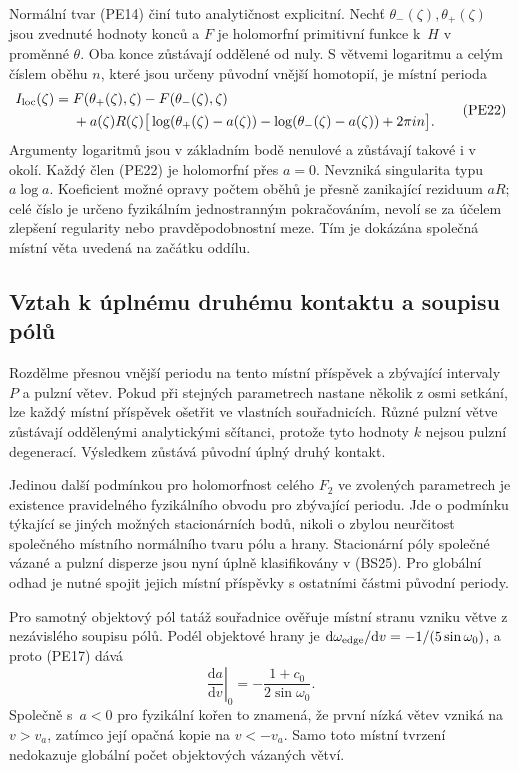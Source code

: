 \documentclass[11pt,a4paper]{article}
\theoremstyle{remark}\newtheorem{remark}[theorem]{Poznámka}
\numberwithin{equation}{section}
\begin{document}
Normální tvar (PE14) činí tuto analytičnost explicitní.
Nechť \(\theta_-(\zeta),\theta_+(\zeta)\) jsou zvednuté
hodnoty konců a \(F\) je holomorfní primitivní funkce k~\(H\)
v proměnné \(\theta\). Oba konce zůstávají oddělené od nuly.
S větvemi logaritmu a celým číslem oběhu \(n\), které jsou
určeny původní vnější homotopií, je místní perioda
\[
\begin{aligned}
I_{\rm loc}(\zeta)={}&
F(\theta_+(\zeta),\zeta)-F(\theta_-(\zeta),\zeta)\\
&+a(\zeta)R(\zeta)
\big[\log(\theta_+(\zeta)-a(\zeta))
-\log(\theta_-(\zeta)-a(\zeta))+2\pi i n\big].
\end{aligned}
\tag{PE22}
\]
Argumenty logaritmů jsou v základním bodě nenulové a zůstávají
takové i v okolí. Každý člen (PE22) je holomorfní přes
\(a=0\). Nevzniká singularita typu \(a\log a\). Koeficient
možné opravy počtem oběhů je přesně zanikající reziduum \(aR\);
celé číslo je určeno fyzikálním jednostranným pokračováním,
nevolí se za účelem zlepšení regularity nebo pravděpodobnostní
meze. Tím je dokázána společná místní věta uvedená na začátku
oddílu.

\subsection{Vztah k úplnému druhému kontaktu a soupisu pólů}

Rozdělme přesnou vnější periodu na tento místní příspěvek
a zbývající intervaly \(P\) a pulzní větev. Pokud při stejných
parametrech nastane několik z osmi setkání, lze každý místní
příspěvek ošetřit ve vlastních souřadnicích. Různé pulzní větve
zůstávají oddělenými analytickými sčítanci, protože tyto hodnoty
\(k\) nejsou pulzní degenerací. Výsledkem zůstává původní úplný
druhý kontakt.

Jedinou další podmínkou pro holomorfnost celého \(F_2\) ve
zvolených parametrech je existence pravidelného fyzikálního
obvodu pro zbývající periodu. Jde o podmínku týkající se jiných
možných stacionárních bodů, nikoli o zbylou neurčitost společného
místního normálního tvaru pólu a hrany. Stacionární póly společné vázané a pulzní disperze jsou nyní
úplně klasifikovány v (BS25). Pro globální odhad je nutné
spojit jejich místní příspěvky s ostatními částmi původní periody.

Pro samotný objektový pól tatáž souřadnice ověřuje místní stranu
vzniku větve z nezávislého soupisu pólů. Podél objektové hrany je
\(\mathrm d\omega_{\rm edge}/\mathrm dv=-1/(5\sin\omega_0)\),
a proto (PE17) dává
\[
\left.\frac{\mathrm da}{\mathrm dv}\right|_0
=-\frac{1+c_0}{2\sin\omega_0}.
\tag{PE23}
\]
Společně s~\(a<0\) pro fyzikální kořen to znamená, že první
nízká větev vzniká na \(v>v_a\), zatímco její opačná kopie
na \(v<-v_a\). Samo toto místní tvrzení nedokazuje globální
počet objektových vázaných větví.
\end{document}
